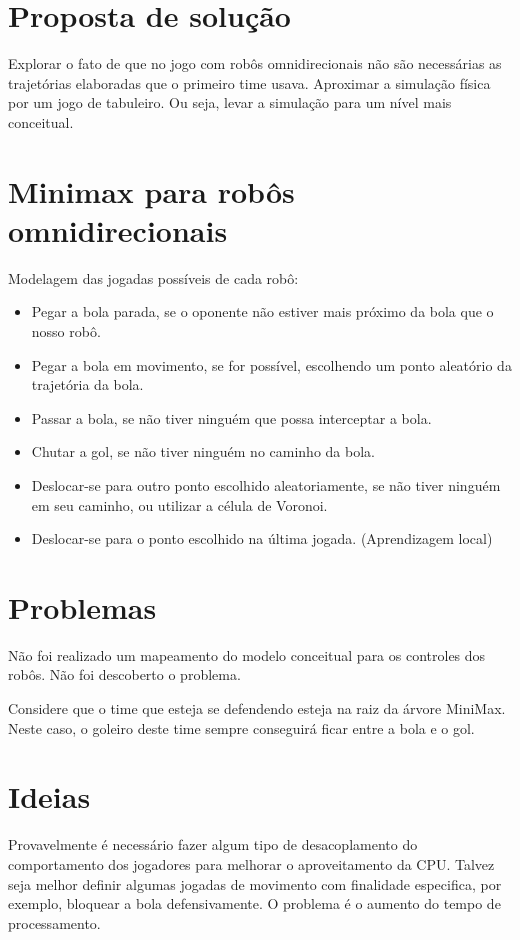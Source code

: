 \section{Proposta de solução}

Explorar o fato de que no jogo com robôs omnidirecionais não são necessárias as
trajetórias elaboradas que o primeiro time usava.  Aproximar a simulação física
por um jogo de tabuleiro. Ou seja, levar a simulação para um nível mais
conceitual.

\section{Minimax para robôs omnidirecionais}

Modelagem das jogadas possíveis de cada robô:

\begin{itemize}
 \item Pegar a bola parada, se o oponente não estiver mais próximo da bola que o
 nosso robô.
 \item Pegar a bola em movimento, se for possível, escolhendo um ponto aleatório
 da trajetória da bola.
 \item Passar a bola, se não tiver ninguém que possa interceptar a bola.
 \item Chutar a gol, se não tiver ninguém no caminho da bola.
 \item Deslocar-se para outro ponto escolhido aleatoriamente, se não tiver ninguém
 em seu caminho, ou utilizar a célula de Voronoi.
 \item Deslocar-se para o ponto escolhido na última jogada. (Aprendizagem local)
\end{itemize}

\section{Problemas}

Não foi realizado um mapeamento do modelo conceitual para os controles dos
robôs. Não foi descoberto o problema.

Considere que o time que esteja se defendendo esteja na raiz da árvore MiniMax.
Neste caso, o goleiro deste time sempre conseguirá ficar entre a bola e o gol.

\section{Ideias}

Provavelmente é necessário fazer algum tipo de desacoplamento do comportamento dos
jogadores para melhorar o aproveitamento da CPU\@.  Talvez seja melhor definir
algumas jogadas de movimento com finalidade especifica, por exemplo, bloquear a
bola defensivamente. O problema é o aumento do tempo de processamento.

